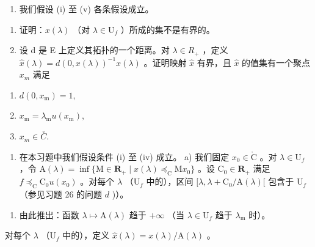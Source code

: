 \begin{enumerate}
\def\labelenumi{\arabic{enumi})}
\setcounter{enumi}{26}
\tightlist
\item
  我们假设 (i) 至 (v) 各条假设成立。
\end{enumerate}

\begin{enumerate}
\def\labelenumi{\alph{enumi})}
\item
  证明：\(x(\lambda)\) （对 \(\lambda \in \mathrm{U}_f\) ）所成的集不是有界的。
\item
  设 d 是 E 上定义其拓扑的一个距离。对 \(\lambda \in R_{+}\) ，定义 \(\hat{x}(\lambda) = d(0, x(\lambda))^{-1}x(\lambda)\) 。证明映射 \(\hat{x}\) 有界，且 \(\hat{x}\) 的值集有一个聚点 \(x_{m}\) 满足
\end{enumerate}

\begin{enumerate}
\def\labelenumi{(\roman{enumi})}
\item
  \(d(0, x_{\mathrm{m}}) = 1,\)
\item
  \(x_{\mathrm{m}} = \lambda_{\mathrm{m}} u(x_{\mathrm{m}}),\)
\item
  \(x_{m} \in \overset{\circ}{C}.\)
\end{enumerate}

\begin{enumerate}
\def\labelenumi{\arabic{enumi})}
\setcounter{enumi}{27}
\tightlist
\item
  在本习题中我们假设条件 (i) 至 (iv) 成立。 a) 我们固定 \(x_0 \in \mathring{\mathrm{C}}\) 。对 \(\lambda \in \mathrm{U}_f\) ，令 \(\mathrm{A}(\lambda) = \inf \{\mathrm{M} \in \mathbf{R}_+ \mid x(\lambda) \preccurlyeq_{\mathrm{C}} \mathrm{M}x_0\}\) 。设 \(\mathrm{C}_0 \in \mathbf{R}_+\) 满足 \(f \preccurlyeq_{\mathrm{C}} \mathrm{C}_0 u(x_0)\) 。对每个 \(\lambda\) （\(\mathrm{U}_f\) 中的），区间 \([\lambda, \lambda + \mathrm{C}_0 / \mathrm{A}(\lambda)[\) 包含于 \(\mathrm{U}_f\) （参见习题 26 的问题 \(d\) )）。
\end{enumerate}

\begin{enumerate}
\def\labelenumi{\alph{enumi})}
\setcounter{enumi}{1}
\tightlist
\item
  由此推出：函数 \(\lambda \mapsto \mathrm{A}(\lambda)\) 趋于 \(+\infty\) （当 \(\lambda \in \mathrm{U}_f\) 趋于 \(\lambda_{\mathrm{m}}\) 时）。
\end{enumerate}

对每个 \(\lambda\) （\(\mathrm{U}_f\) 中的），定义 \(\hat{x} (\lambda) = x(\lambda) / \mathrm{A}(\lambda)\) 。

